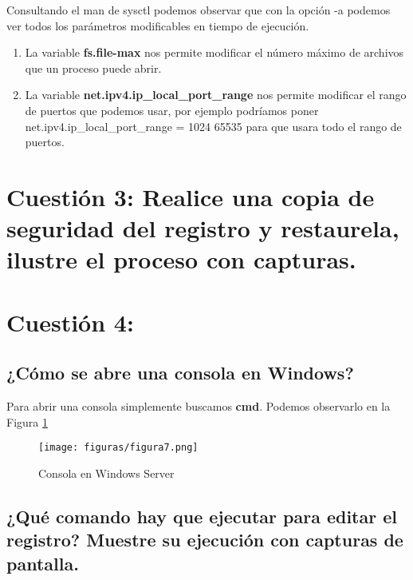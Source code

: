 Consultando el man de sysctl \cite{sysctl2} podemos observar que con la opción -a podemos ver todos los parámetros modificables en tiempo de ejecución.

\begin{enumerate}
	\item La variable \textbf{fs.file-max} nos permite modificar el número máximo de archivos que un proceso puede abrir.
	\item La variable \textbf{net.ipv4.ip\_local\_port\_range} nos permite modificar el rango de puertos que podemos usar, por ejemplo podríamos poner net.ipv4.ip\_local\_port\_range = 1024 65535 para que usara todo el rango de puertos.
\end{enumerate}


\section{Cuestión 3: Realice una copia de seguridad del registro y restaurela, ilustre el proceso con capturas.}


\section{Cuestión 4:}

\subsection{¿Cómo se abre una consola en Windows?}
Para abrir una consola simplemente buscamos \textbf{cmd}. Podemos observarlo en la Figura \ref{figura7}

\begin{figure}[H] %
	\centering
	\texttt{[image: figuras/figura7.png]}  %
	
	
	\caption{Consola en Windows Server}
	\label{figura7}
\end{figure}
\subsection{¿Qué comando hay que ejecutar para editar el registro? Muestre su ejecución con capturas de pantalla.}

